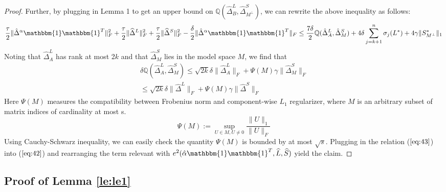 \documentclass[AMS,STIX1COL]{WileyNJD-v2}
\begin{document}
{\begin{proof}
Further, by plugging in Lemma 1 to get an upper bound on  $\mathbb{Q}(\widehat{\Delta}^L_{B},\widehat{\Delta}^S_{M^\perp})$, we can rewrite the above inequality as follows:
\begin{align}
    \frac{\tau}{2} \|\hat{\Delta}^{\alpha}\mathbbm{1}\mathbbm{1}^T\|_{F}^{2} + \frac{\tau}{2} \|\widehat{\Delta}^{L}\|_{F}^{2} + \frac{\tau}{2} \|\widehat{\Delta}^{S}\|_{F}^{2} -
    \frac{\delta}{2} \|\hat{\Delta}^{\alpha}\mathbbm{1}\mathbbm{1}^T\|_{F}
    \leq
    \frac{7\delta}{2}\mathbb{Q}(\hat{\Delta}^L_{A},\hat{\Delta}^S_{M}) + 4 \delta \sum_{j=k+1}^{n} \sigma_{j}(L^*) + 4\gamma \|S^*_{M^\perp}\|_{1}  \label{eq:42}
\end{align}
Noting that $\widehat{\Delta}^{L}_{A}$ has rank at most 2$k$ and that $\widehat{\Delta}^{S}_{M}$ lies in the model space $M$, we find that
\begin{align}
    \nonumber
    \delta\mathbb{Q}(\widehat{\Delta}^L_{A},\widehat{\Delta}^S_{M})
    \leq \sqrt{2k}\delta\|\widehat{\Delta}^L_{A}\|_{F} + \Psi(M)\gamma\|\widehat{\Delta}^S_M\|_{F}\\
    \leq \sqrt{2k}\delta\|\widehat{\Delta}^L\|_{F} + \Psi(M)\gamma\|\widehat{\Delta}^S\|_{F}  \label{eq:43}
\end{align}
Here $\Psi(M)$ measures the compatibility between Frobenius norm and component-wise $L_{1}$ regularizer, where $M$ is an arbitrary subset of matrix indices of cardinality at most s.
\[
    \Psi(M):=\sup\limits_{U\in M,U\neq0}\frac{\|U\|_{1}}{\|U\|_{F}}
\]
Using Cauchy-Schwarz inequality, we can easily check the quantity $\Psi(M)$ is bounded by at most $\sqrt{s}$. Plugging in the relation ($\ref{eq:43}$) into ($\ref{eq:42}$) and rearranging the term relevant with  $e^{2}(\hat{\alpha}\mathbbm{1}\mathbbm{1}^T,\widehat{L},\widehat{S})$ yield the claim.
\end{proof}


\subsection{Proof of Lemma \ref{le:le1}}

}
\end{document}

